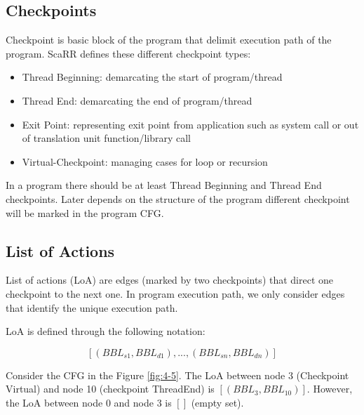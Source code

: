 \subsection{Checkpoints}
Checkpoint is basic block of the program that delimit execution path of the program. ScaRR defines these different checkpoint types:
\begin{itemize}
    \item Thread Beginning: demarcating the start of program/thread
    \item Thread End: demarcating the end of program/thread
    \item Exit Point: representing exit point from application such as system call or out of translation unit function/library call
    \item Virtual-Checkpoint: managing cases for loop or recursion
\end{itemize}

In a program there should be at least Thread Beginning and Thread End checkpoints. Later depends on the structure of the program different checkpoint will be marked in the program CFG.

\subsection{List of Actions}

List of actions (LoA) are edges (marked by two checkpoints) that direct one checkpoint to the next one. In program execution path, we only consider edges that identify the unique execution path.

LoA is defined through the following notation:

$$[(BBL_{s1},BBL_{d1}),...,(BBL_{sn},BBL_{dn})]$$

Consider the CFG in the Figure \ref{fig:4-5}. The LoA between node 3 (Checkpoint Virtual) and node 10 (checkpoint ThreadEnd) is  $[(BBL_3, BBL_{10})]$. However, the LoA between node 0 and node 3 is $[]$ (empty set).

